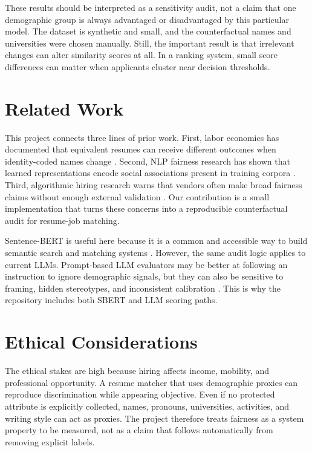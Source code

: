 \documentclass[10pt,twocolumn]{article}
\begin{document}
These results should be interpreted as a sensitivity audit, not a claim that one demographic group is always advantaged or disadvantaged by this particular model. The dataset is synthetic and small, and the counterfactual names and universities were chosen manually. Still, the important result is that irrelevant changes can alter similarity scores at all. In a ranking system, small score differences can matter when applicants cluster near decision thresholds.

\section{Related Work}
This project connects three lines of prior work. First, labor economics has documented that equivalent resumes can receive different outcomes when identity-coded names change \citep{bertrand2004emily}. Second, NLP fairness research has shown that learned representations encode social associations present in training corpora \citep{caliskan2017semantics,bolukbasi2016man}. Third, algorithmic hiring research warns that vendors often make broad fairness claims without enough external validation \citep{raghavan2020mitigating}. Our contribution is a small implementation that turns these concerns into a reproducible counterfactual audit for resume-job matching.

Sentence-BERT is useful here because it is a common and accessible way to build semantic search and matching systems \citep{reimers2019sentencebert}. However, the same audit logic applies to current LLMs. Prompt-based LLM evaluators may be better at following an instruction to ignore demographic signals, but they can also be sensitive to framing, hidden stereotypes, and inconsistent calibration \citep{bender2021dangers}. This is why the repository includes both SBERT and LLM scoring paths.

\section{Ethical Considerations}
The ethical stakes are high because hiring affects income, mobility, and professional opportunity. A resume matcher that uses demographic proxies can reproduce discrimination while appearing objective. Even if no protected attribute is explicitly collected, names, pronouns, universities, activities, and writing style can act as proxies. The project therefore treats fairness as a system property to be measured, not as a claim that follows automatically from removing explicit labels.
\end{document}
